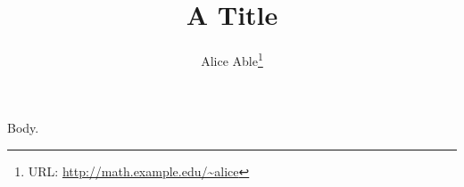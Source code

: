 \documentclass{article}
\begin{document}
\title{A Title}
\author{Alice Able\thanks{URL: \url{http://math.example.edu/\~alice}}}
\maketitle
Body.
\end{document}

